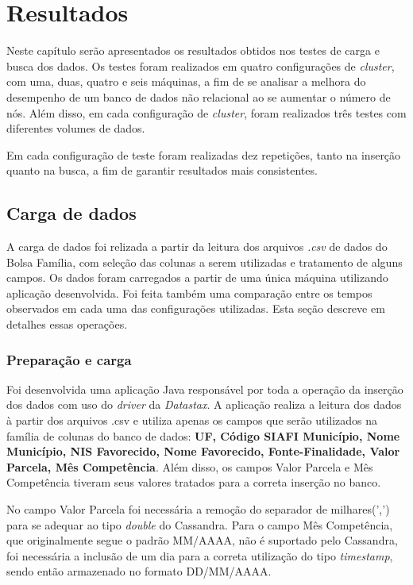 \chapter{Resultados}

Neste capítulo serão apresentados os resultados obtidos nos testes de carga e busca dos dados. Os testes foram realizados em quatro configurações de \emph{cluster}, com uma, duas, quatro e seis máquinas, a fim de se analisar a melhora do desempenho de um banco de dados não relacional ao se aumentar o número de nós. Além disso, em cada configuração de \emph{cluster}, foram realizados três testes com diferentes volumes de dados. 

Em cada configuração de teste foram realizadas dez repetições, tanto na inserção quanto na busca, a fim de garantir resultados mais consistentes. 

\section{Carga de dados}
A carga de dados foi relizada a partir da leitura dos arquivos \emph{.csv} de dados do Bolsa Família, com seleção das colunas a serem utilizadas e tratamento de alguns campos.
Os dados foram carregados a partir de uma única máquina utilizando aplicação desenvolvida. Foi feita também uma comparação entre os tempos observados em cada uma das configurações utilizadas. Esta seção descreve em detalhes essas operações.

\subsection{Preparação e carga}
Foi desenvolvida uma aplicação Java responsável por toda a operação da inserção dos dados com uso do \emph{driver} da \emph{Datastax}. A aplicação realiza a leitura dos dados à partir dos arquivos .csv e utiliza apenas os campos que serão utilizados na família de colunas do banco de dados: \textbf{UF, Código SIAFI Município, Nome Município, NIS Favorecido, Nome Favorecido, Fonte-Finalidade, Valor Parcela, Mês Competência}. Além disso, os campos Valor Parcela e Mês Competência tiveram seus valores tratados para a correta inserção no banco.

No campo Valor Parcela foi necessária a remoção do separador de milhares(',') para se adequar ao tipo \emph{double} do Cassandra. Para o campo Mês Competência, que originalmente segue o padrão MM/AAAA, não é suportado pelo Cassandra, foi necessária a inclusão de um dia para a correta utilização do tipo \emph{timestamp}, sendo então armazenado no formato DD/MM/AAAA.

